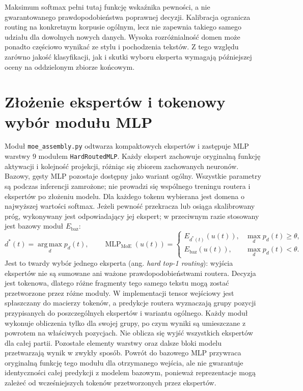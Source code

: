 Maksimum softmax pełni tutaj funkcję wskaźnika pewności, a nie gwarantowanego prawdopodobieństwa poprawnej decyzji. Kalibracja ogranicza routing na konkretnym korpusie ogólnym, lecz nie zapewnia takiego samego udziału dla dowolnych nowych danych. Wysoka rozróżnialność domen może ponadto częściowo wynikać ze stylu i pochodzenia tekstów. Z tego względu zarówno jakość klasyfikacji, jak i skutki wyboru eksperta wymagają późniejszej oceny na oddzielonym zbiorze końcowym.

\section{Złożenie ekspertów i tokenowy wybór modułu MLP}
\label{sec:skladanie_moe}

Moduł \texttt{moe\_assembly.py} odtwarza kompaktowych ekspertów i zastępuje MLP warstwy $9$ modułem \texttt{HardRoutedMLP}. Każdy ekspert zachowuje oryginalną funkcję aktywacji i kolejność projekcji, różniąc się zbiorem zachowanych neuronów. Bazowy, gęsty MLP pozostaje dostępny jako wariant ogólny. Wszystkie parametry są podczas inferencji zamrożone; nie prowadzi się wspólnego treningu routera i ekspertów po złożeniu modelu. \newline
Dla każdego tokenu wybierana jest domena o najwyższej wartości softmax. Jeżeli pewność przekracza lub osiąga skalibrowany próg, wykonywany jest odpowiadający jej ekspert; w przeciwnym razie stosowany jest bazowy moduł $E_{\mathrm{baz}}$:
\[
d^*(t)=\operatorname*{arg\,max}_{d}p_d(t),
\qquad
\operatorname{MLP}_{\mathrm{MoE}}(u(t))=
\begin{cases}
E_{d^*(t)}(u(t)), & \max_d p_d(t)\geq\theta,\\
E_{\mathrm{baz}}(u(t)), & \max_d p_d(t)<\theta.
\end{cases}
\]
Jest to twardy wybór jednego eksperta (ang. \textit{hard top-1 routing}): wyjścia ekspertów nie są sumowane ani ważone prawdopodobieństwami routera. Decyzja jest tokenowa, dlatego różne fragmenty tego samego tekstu mogą zostać przetworzone przez różne moduły. \newline
W implementacji tensor wejściowy jest spłaszczany do macierzy tokenów, a predykcje routera wyznaczają grupy pozycji przypisanych do poszczególnych ekspertów i wariantu ogólnego. Każdy moduł wykonuje obliczenia tylko dla swojej grupy, po czym wyniki są umieszczane z powrotem na właściwych pozycjach. Nie oblicza się wyjść wszystkich ekspertów dla całej partii. Pozostałe elementy warstwy oraz dalsze bloki modelu przetwarzają wynik w zwykły sposób. Powrót do bazowego MLP przywraca oryginalną funkcję tego modułu dla otrzymanego wejścia, ale nie gwarantuje identyczności całej predykcji z modelem bazowym, ponieważ reprezentacje mogą zależeć od wcześniejszych tokenów przetworzonych przez ekspertów. \newline
